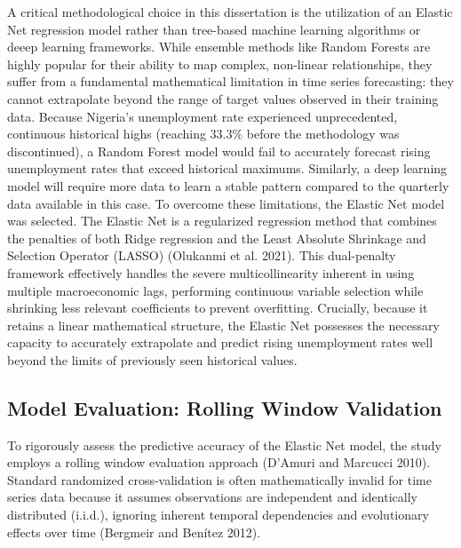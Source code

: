 \documentclass[
  letterpaper,
  DIV=11,
  numbers=noendperiod]{scrartcl}
\begin{document}
A critical methodological choice in this dissertation is the utilization
of an Elastic Net regression model rather than tree-based machine
learning algorithms or deeep learning frameworks. While ensemble methods
like Random Forests are highly popular for their ability to map complex,
non-linear relationships, they suffer from a fundamental mathematical
limitation in time series forecasting: they cannot extrapolate beyond
the range of target values observed in their training data. Because
Nigeria's unemployment rate experienced unprecedented, continuous
historical highs (reaching 33.3\% before the methodology was
discontinued), a Random Forest model would fail to accurately forecast
rising unemployment rates that exceed historical maximums. Similarly, a
deep learning model will require more data to learn a stable pattern
compared to the quarterly data available in this case. To overcome these
limitations, the Elastic Net model was selected. The Elastic Net is a
regularized regression method that combines the penalties of both Ridge
regression and the Least Absolute Shrinkage and Selection Operator
(LASSO) (Olukanmi et al. 2021). This dual-penalty framework effectively
handles the severe multicollinearity inherent in using multiple
macroeconomic lags, performing continuous variable selection while
shrinking less relevant coefficients to prevent overfitting. Crucially,
because it retains a linear mathematical structure, the Elastic Net
possesses the necessary capacity to accurately extrapolate and predict
rising unemployment rates well beyond the limits of previously seen
historical values.

\subsection{Model Evaluation: Rolling Window
Validation}\label{model-evaluation-rolling-window-validation}

To rigorously assess the predictive accuracy of the Elastic Net model,
the study employs a rolling window evaluation approach (D'Amuri and
Marcucci 2010). Standard randomized cross-validation is often
mathematically invalid for time series data because it assumes
observations are independent and identically distributed (i.i.d.),
ignoring inherent temporal dependencies and evolutionary effects over
time (Bergmeir and Benítez 2012).
\end{document}
